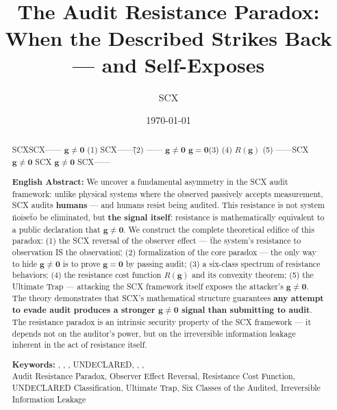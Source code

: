 \documentclass[12pt,a4paper]{article}
\title{\textbf{\\}\\[8pt]
\large The Audit Resistance Paradox: \\
When the Described Strikes Back — and Self-Exposes}\\[8pt]
\author{SCX}
\date{\today}
\theoremstyle{remark}
\newcommand{\g}{\mathbf{g}}
\begin{document}
\maketitle

\begin{abstract}
\noindent
\textbf{} SCXSCX\textbf{}——\"\"\textbf{} $ \g \neq \mathbf{0} $ (1) SCX——\"\"(2) —— $ \g \neq \mathbf{0} $  $ \g = \mathbf{0} $(3) (4)  $ R(\g) $ (5) ——SCX $ \g \neq \mathbf{0} $ SCX\textbf{} $ \g \neq \mathbf{0} $ \textbf{}SCX——

\vspace{6pt}
\noindent
\textbf{English Abstract:} We uncover a fundamental asymmetry in the SCX audit framework: unlike physical systems where the observed passively accepts measurement, SCX audits \textbf{humans} — and humans resist being audited. This resistance is not system \"noise\" to be eliminated, but \textbf{the signal itself}: resistance is mathematically equivalent to a public declaration that $ \g \neq \mathbf{0} $. We construct the complete theoretical edifice of this paradox: (1) the SCX reversal of the observer effect — \"the system's resistance to observation IS the observation\"; (2) formalization of the core paradox — the only way to hide $ \g \neq \mathbf{0} $ is to prove $ \g = \mathbf{0} $ by passing audit; (3) a six-class spectrum of resistance behaviors; (4) the resistance cost function $ R(\g) $ and its convexity theorem; (5) the Ultimate Trap — attacking the SCX framework itself exposes the attacker's $ \g \neq \mathbf{0} $. The theory demonstrates that SCX's mathematical structure guarantees \textbf{any attempt to evade audit produces a stronger $ \g \neq \mathbf{0} $ signal than submitting to audit}. The resistance paradox is an intrinsic security property of the SCX framework — it depends not on the auditor's power, but on the irreversible information leakage inherent in the act of resistance itself.

\vspace{6pt}
\noindent
\textbf{Keywords:} , , , UNDECLARED, , ,  \\[4pt]
Audit Resistance Paradox, Observer Effect Reversal, Resistance Cost Function, UNDECLARED Classification, Ultimate Trap, Six Classes of the Audited, Irreversible Information Leakage
\end{abstract}

\newpage
\tableofcontents
\newpage

\end{document}
